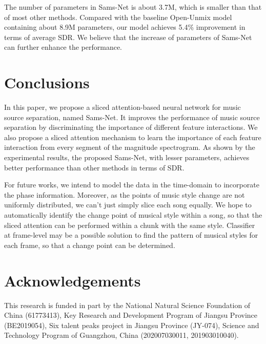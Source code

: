 \documentclass[a4paper]{article}
\begin{document}
The number of parameters in Sams-Net is about 3.7M, which is smaller than that of most other methods. Compared with the baseline Open-Unmix model \cite{stoter2019open} containing about 8.9M parameters, our model achieves 5.4\% improvement in terms of average SDR. We believe that the increase of parameters of Sams-Net can further enhance the performance.

\section{Conclusions}
In this paper, we propose a sliced attention-based neural network for music source separation, named Sams-Net. It improves the performance of music source separation by discriminating the importance of different feature interactions. We also propose a sliced attention mechanism to learn the importance of each feature interaction from every segment of the magnitude spectrogram. As shown by the experimental results, the proposed Sams-Net, with lesser parameters, achieves better performance than other methods in terms of SDR.

For future works, we intend to model the data in the time-domain to incorporate the phase information. Moreover, as the points of music style change are not uniformly distributed, we can't just simply slice each song equally. We hope to automatically identify the change point of musical style within a song, so that the sliced attention can be performed within a chunk with the same style. Classifier at frame-level may be a possible solution to find the pattern of musical styles for each frame, so that a change point can be determined.

\section{Acknowledgements}
This research is funded in part by the National Natural Science Foundation of China (61773413), Key Research and Development Program of Jiangsu Province (BE2019054), Six talent peaks project in Jiangsu Province (JY-074), Science and Technology Program of Guangzhou, China (202007030011, 201903010040).




\end{document}
